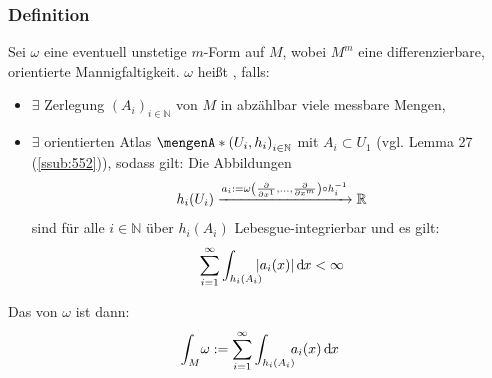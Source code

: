 \subsubsection[Definition: Integrierbarkeit und das Integral einer $k$-Form]{Definition} %
\label{ssub:553}
Sei $\omega$ eine eventuell unstetige $m$-Form auf $M$, wobei $M^m$ eine differenzierbare, orientierte Mannigfaltigkeit. $\omega$ heißt , falls:
\begin{itemize}
	\item $\exists$ Zerlegung $(A_i)_{i \in \mathds{N}}$ von $M$ in abzählbar viele messbare Mengen,
	\item $\exists$ orientierten Atlas $\set{(U_i,h_i)}_{i \in \mathds{N}}$ mit $A_i \subset U_1$ (vgl. Lemma 27 (\ref{ssub:552})), sodass gilt: Die Abbildungen
	\[
		h_i(U_i) \xrightarrow{a_i := \omega \enbrace*{\diff{}{x^1}, \ldots , \diff{}{x^m}}\circ  h_i ^{-1} } \mathds{R} 
	\]
	sind für alle $i \in \mathds{N}$ über $h_i(A_i)$ Lebesgue-integrierbar und es gilt: 
	\[
		\sum_{i=1}^{\infty} \int_{h_i(A_i)}\! \! \! \abs*{a_i(x)}  \, \mathd x < \infty 
	\]
\end{itemize} 
Das  von $\omega$ ist dann:
\[
	\int_{M}\! \omega := \sum_{i=1}^{\infty} \int_{h_i(A_i)} \! \! \! a_i(x)  \, \mathd x  
\] 

